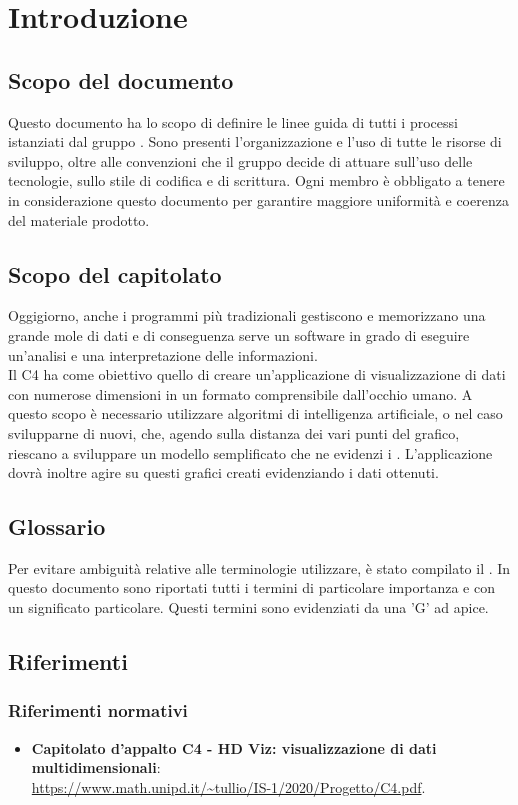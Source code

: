 \section{Introduzione}
\subsection{Scopo del documento}
Questo documento ha lo scopo di definire le linee guida di tutti i processi istanziati dal gruppo \Gruppo{}. Sono presenti l'organizzazione e l'uso di tutte le risorse di sviluppo, oltre alle convenzioni che il gruppo decide di attuare sull'uso delle tecnologie, sullo stile di codifica e di scrittura. Ogni membro è obbligato a tenere in considerazione questo documento per garantire maggiore uniformità e coerenza del materiale prodotto.

\subsection{Scopo del capitolato}
Oggigiorno, anche i programmi più tradizionali gestiscono e memorizzano una grande mole di dati e di conseguenza serve un software in grado di eseguire un'analisi e una interpretazione delle informazioni.\\
Il  C4 ha come obiettivo quello di creare un'applicazione di visualizzazione di dati con numerose dimensioni in un formato comprensibile dall'occhio umano.  A questo scopo è necessario utilizzare algoritmi di intelligenza artificiale, o nel caso svilupparne di nuovi, che, agendo sulla distanza dei vari punti del grafico, riescano a sviluppare un modello semplificato che ne evidenzi i . 
L'applicazione dovrà inoltre agire su questi grafici creati evidenziando i dati ottenuti.

\subsection{Glossario}
Per evitare ambiguità relative alle terminologie utilizzare, è stato compilato il . In questo documento sono riportati tutti i termini di particolare importanza e con un significato particolare. Questi termini sono evidenziati da una 'G' ad apice.

\subsection{Riferimenti}
\subsubsection{Riferimenti normativi}
\begin{itemize}	
	\item \textbf{Capitolato d'appalto C4 - HD Viz: visualizzazione di dati multidimensionali}:\\
	\textcolor{blue}{\url{https://www.math.unipd.it/~tullio/IS-1/2020/Progetto/C4.pdf}}.
\end{itemize}


